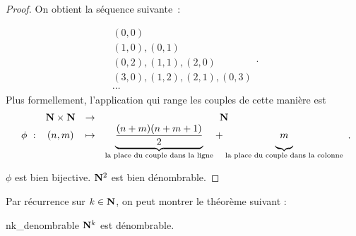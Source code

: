 \documentclass[a4paper,french,final]{memoir}
\begin{document}
\begin{proof}
	On obtient la séquence suivante~:
	
	\[\begin{array}{l}
		(0,0) \\
		(1,0), (0,1) \\
		(0,2), (1,1), (2,0) \\
		(3,0), (1,2), (2,1), (0,3) \\
		\cdots
	\end{array}.\]
	Plus formellement, l'application qui range les couples de cette manière est 
	\[\begin{array}{cccc}
		\ & \NN \times \NN & \to & \NN \\
		\phi~: & (n,m) & \mapsto & {\underbrace{\frac{(n+m)(n+m+1)}{2}}_{\text{la place du couple dans la ligne}}} +  {\underbrace{\vphantom{\frac{(n+m)(n+m+1)}{2}} m}_{\text{la place du couple dans la colonne}}}
	\end{array}.\]
	
	
	$\phi$ est bien bijective. $\mathbf{N}^2$ est bien dénombrable.
\end{proof}


Par récurrence sur $k \in \mathbf{N}$, on peut montrer le théorème suivant :
\begin{theoremb}{}{nk_denombrable}
    $\mathbf{N}^k$ est dénombrable.
\end{theoremb}
\end{document}
